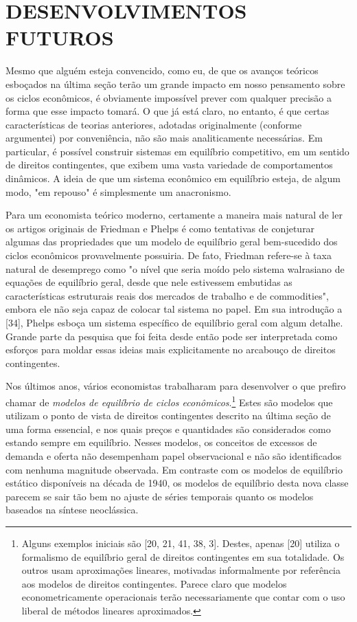 \documentclass[12pt]{article}
\begin{document}
\section{DESENVOLVIMENTOS FUTUROS}

Mesmo que alguém esteja convencido, como eu, de que os avanços teóricos esboçados na última seção terão um grande impacto em nosso pensamento sobre os ciclos econômicos, é obviamente impossível prever com qualquer precisão a forma que esse impacto tomará. O que já está claro, no entanto, é que certas características de teorias anteriores, adotadas originalmente (conforme argumentei) por conveniência, não são mais analiticamente necessárias. Em particular, é possível construir sistemas em equilíbrio competitivo, em um sentido de direitos contingentes, que exibem uma vasta variedade de comportamentos dinâmicos. A ideia de que um sistema econômico em equilíbrio esteja, de algum modo, "em repouso" é simplesmente um anacronismo.

Para um economista teórico moderno, certamente a maneira mais natural de ler os artigos originais de Friedman e Phelps é como tentativas de conjeturar algumas das propriedades que um modelo de equilíbrio geral bem-sucedido dos ciclos econômicos provavelmente possuiria. De fato, Friedman refere-se à taxa natural de desemprego como "o nível que seria moído pelo sistema walrasiano de equações de equilíbrio geral, desde que nele estivessem embutidas as características estruturais reais dos mercados de trabalho e de commodities", embora ele não seja capaz de colocar tal sistema no papel. Em sua introdução a [34], Phelps esboça um sistema específico de equilíbrio geral com algum detalhe. Grande parte da pesquisa que foi feita desde então pode ser interpretada como esforços para moldar essas ideias mais explicitamente no arcabouço de direitos contingentes.

Nos últimos anos, vários economistas trabalharam para desenvolver o que prefiro chamar de \textit{modelos de equilíbrio de ciclos econômicos}.\footnote{Alguns exemplos iniciais são [20, 21, 41, 38, 3]. Destes, apenas [20] utiliza o formalismo de equilíbrio geral de direitos contingentes em sua totalidade. Os outros usam aproximações lineares, motivadas informalmente por referência aos modelos de direitos contingentes. Parece claro que modelos econometricamente operacionais terão necessariamente que contar com o uso liberal de métodos lineares aproximados.} Estes são modelos que utilizam o ponto de vista de direitos contingentes descrito na última seção de uma forma essencial, e nos quais preços e quantidades são considerados como estando sempre em equilíbrio. Nesses modelos, os conceitos de excessos de demanda e oferta não desempenham papel observacional e não são identificados com nenhuma magnitude observada. Em contraste com os modelos de equilíbrio estático disponíveis na década de 1940, os modelos de equilíbrio desta nova classe parecem se sair tão bem no ajuste de séries temporais quanto os modelos baseados na síntese neoclássica.
\end{document}
